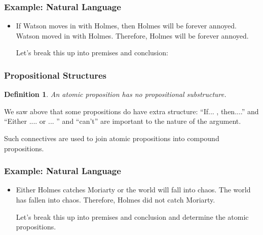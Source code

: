 \documentclass{beamer}
\theoremstyle{indentDefn} \newtheorem{defn}[]{Definition}
\begin{document}
\begin{frame}
	\frametitle{Example: Natural Language}
	
	\begin{itemize}
		\item If Watson moves in with Holmes, then Holmes will be forever annoyed. Watson moved in with Holmes. Therefore, Holmes will be forever annoyed.

		\vspace{0.5cm}

		Let's break this up into premises and conclusion: 
		
		\vspace{5cm}
		
		
	\end{itemize}
\end{frame}

\begin{frame}
	\frametitle{Propositional Structures}
	
	\begin{defn} 
		
		An atomic proposition has no propositional substructure.
		
	\end{defn}


	
	We saw above that some propositions do have extra structure: ``If... , then....'' and ``Either .... or ... '' and ``can't'' are important to the nature of the argument. 
	
	\vspace{0.5cm}
	
	Such connectives are used to join atomic propositions into compound propositions.	
\end{frame}

\begin{frame}
	\frametitle{Example: Natural Language}
	
	\begin{itemize}
		\item Either Holmes catches Moriarty or the world will fall into chaos. The world has fallen into chaos. Therefore, Holmes did not catch Moriarty.
		
		\vspace{0.5cm}
		
		Let's break this up into premises and conclusion and determine the atomic propositions.
		
		\vspace{5cm}
		
		
	\end{itemize}
\end{frame}
\end{document}
